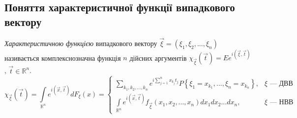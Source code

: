 \subsection{Поняття характеристичної функції випадкового вектору}
\begin{definition}
    \emph{Характеристичною функцією} випадкового вектору $\vec{\xi} = \left( \xi_1, \xi_2, ..., \xi_n\right)$ 
    називається комплекснозначна функція $n$ дійсних аргументів $\chi_{\vec{\xi}}(\vec{t}) = Ee^{i(\vec{\xi}, \vec{t})}$, $\vec{t} \in \mathbb{R}^n$.
    \begin{equation}\label{eq:char_func_vect}
        \chi_{\vec{\xi}}(\vec{t}) = \int\limits_{\mathbb{R}^n} e^{i(\vec{x}, \vec{t})} dF_\xi(x) = \begin{cases}
            \sum\limits_{k_1,k_2, ..., k_n} e^{i \sum\limits_{j=1}^n x_{k_j}t_j} P\left\{\xi_1 = x_{k_1}, ..., \xi_n = x_{k_n}\right\}, & \xi \text{ --- ДВВ} \\
            \int\limits_{\mathbb{R}^n} e^{i(\vec{x}, \vec{t})} f_{\vec{\xi}}(x_1, x_2, ..., x_n)dx_1 dx_2 ... dx_n, & \xi \text{ --- НВВ}
        \end{cases}
    \end{equation}
\end{definition}

